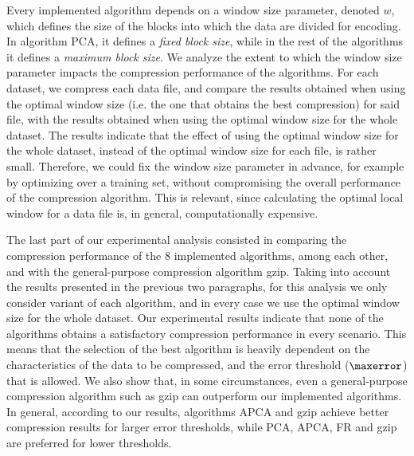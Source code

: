 Every implemented algorithm depends on a window size parameter, denoted $w$, which defines the size of the blocks into which the data are divided for encoding. In algorithm PCA, it defines a \textit{fixed block size}, while in the rest of the algorithms it defines a \textit{maximum block size}. We analyze the extent to which the window size parameter impacts the compression performance of the algorithms. For each dataset, we compress each data file, and compare the results obtained when using the optimal window size (i.e. the one that obtains the best compression) for said file, with the results obtained when using the optimal window size for the whole dataset. The results indicate that the effect of using the optimal window size for the whole dataset, instead of the optimal window size for each file, is rather small. Therefore, we could fix the window size parameter in advance, for example by optimizing over a training set, without compromising the overall performance of the compression algorithm. This is relevant, since calculating the optimal local window for a data file is, in general, computationally expensive.


The last part of our experimental analysis consisted in comparing the compression performance of the 8 implemented algorithms, among each other, and with the general-purpose compression algorithm gzip. Taking into account the results presented in the previous two paragraphs, for this analysis we only consider variant \maskalgo of each algorithm, and in every case we use the optimal window size for the whole dataset. Our experimental results indicate that none of the algorithms obtains a satisfactory compression performance in every scenario. This means that the selection of the best algorithm is heavily dependent on the characteristics of the data to be compressed, and the error threshold ($\maxerror$) that is allowed. We also show that, in some circumstances, even a general-purpose compression algorithm such as gzip can outperform our implemented algorithms. In general, according to our results, algorithms APCA and gzip achieve better compression results for larger error thresholds, while PCA, APCA, FR and gzip are preferred for lower thresholds.


\clearpage


